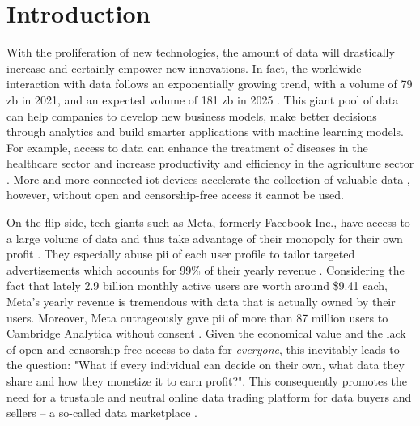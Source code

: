 \chapter{Introduction}
\label{cha:introduction}

With the proliferation of new technologies, the amount of data will drastically increase and certainly empower new innovations. In fact, the worldwide interaction with data follows an exponentially growing trend, with a volume of 79 \acrfull{zb} in 2021, and an expected volume of 181 \acrshort{zb} in 2025 \cite{statistaDataWorldWide}. This giant pool of data can help companies to develop new business models, make better decisions through analytics and build smarter applications with machine learning models. For example, access to data can enhance the treatment of diseases in the healthcare sector \cite{koutsosAgoraPrivacyAwareData,wangBigDataAnalytics2018,suBDTFBlockchainBasedData2020} and increase productivity and efficiency in the agriculture sector \cite{elijahOverviewInternetThings2018}. More and more connected \acrfull{iot} devices accelerate the collection of valuable data \cite{ozyilmazIDMoBIoTData2018,lawrenzBlockchainTechnologyApproach2019}, however, without open and censorship-free access it cannot be used.

On the flip side, tech giants such as Meta, formerly Facebook Inc., have access to a large volume of data and thus take advantage of their monopoly for their own profit \cite{serranoPeertoPeerOwnershipPreservingData2021}. They especially abuse \acrfull{pii} of each user profile to tailor targeted advertisements which accounts for 99\% \cite{GlobalMetaAdvertising} of their yearly revenue \cite{arrategalanLargeScaleAnalysisUser2019}. Considering the fact that lately 2.9 billion monthly active users \cite{FacebookMAUWorldwide} are worth around \$9.41 \cite{FacebookAverageRevenue} each, Meta's yearly revenue is tremendous with data that is actually owned by their users. Moreover, Meta outrageously gave \acrshort{pii} of more than 87 million users to Cambridge Analytica without consent \cite{isaakUserDataPrivacy2018,xiaoPrivacyGuardEnforcingPrivate2020}. Given the economical value and the lack of open and censorship-free access to data for \emph{everyone}, this inevitably leads to the question: "What if every individual can decide on their own, what data they share and how they monetize it to earn profit?". This consequently promotes the need for a trustable and neutral online data trading platform for data buyers and sellers -- a so-called data marketplace \cite{dagevilleSnowflakeElasticData2016,krishnamachariI3IoTMarketplace2018}.

